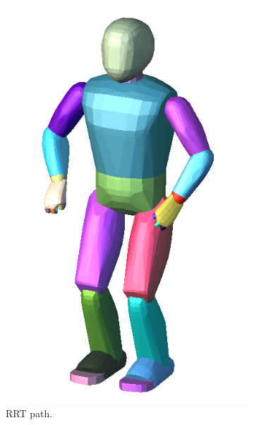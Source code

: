 \begin{figure}
\begin{subfigure}{0.48\columnwidth}
    \includegraphics[width = \columnwidth]
                    {src/chap3-optimal-motion-planning/figure/romeo-convex-hull.png}
    \caption{RRT path.}
    \label{simple-path-solb}
  \end{subfigure}
  \begin{subfigure}{0.48\columnwidth}
    \centering

\end{subfigure}
\end{figure}
